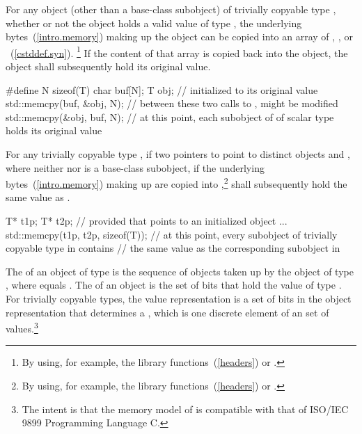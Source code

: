 \pnum
{}%
%
For any object (other than a base-class subobject) of trivially copyable type
, whether or not the object holds a valid value of type
, the underlying bytes~(\ref{intro.memory}) making up the
object can be copied into an array of
,
, or
~(\ref{cstddef.syn}).%
\footnote{By using, for example, the library
functions~(\ref{headers})  or .}
If the content of that array
is copied back into the object, the object shall
subsequently hold its original value. \begin{example}
\begin{codeblock}
#define N sizeof(T)
char buf[N];
T obj;                          //  initialized to its original value
std::memcpy(buf, &obj, N);      // between these two calls to ,  might be modified
std::memcpy(&obj, buf, N);      // at this point, each subobject of  of scalar type holds its original value
\end{codeblock}
\end{example}

\pnum
For any trivially copyable type , if two pointers to  point to
distinct  objects  and , where neither
 nor  is a base-class subobject, if the underlying
bytes~(\ref{intro.memory}) making up
 are copied into ,\footnote{By using, for example,
the library functions~(\ref{headers})  or .}
  shall subsequently hold the same value as
. \begin{example}

\begin{codeblock}
T* t1p;
T* t2p;
    // provided that  points to an initialized object ...
std::memcpy(t1p, t2p, sizeof(T));
    // at this point, every subobject of trivially copyable type in  contains
    // the same value as the corresponding subobject in 
\end{codeblock}
\end{example}%

\pnum
The 
%
of an object of type  is the
sequence of   objects taken up
by the object of type , where  equals
. The
%
of an object is the set of bits that hold
the value of type . For trivially copyable types, the value representation is
a set of bits in the object representation that determines a
, which is one discrete element of an
 set of values.\footnote{The
intent is that the memory model of \Cpp is compatible
with that of ISO/IEC 9899 Programming Language C.}

